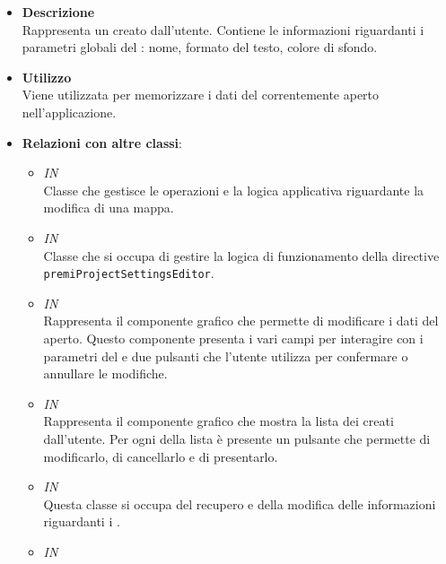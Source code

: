 \FloatBarrier
\begin{itemize}
\item \textbf{Descrizione}\\
Rappresenta un  creato dall’utente. Contiene le informazioni riguardanti i parametri globali del : nome, formato del testo, colore di sfondo.
\item \textbf{Utilizzo}\\
Viene utilizzata per memorizzare i dati del  correntemente aperto nell’applicazione.
\item \textbf{Relazioni con altre classi}:
\begin{itemize}
\item \textit{IN} \hyperref[\nogloxy{Premi::Front-End::Controllers::MindmapEditorController}]{}\\
Classe che gestisce le operazioni e la logica applicativa riguardante la modifica di una mappa.
\item \textit{IN} \hyperref[\nogloxy{Premi::Front-End::Controllers::ProjectSettingsEditorController}]{}\\
Classe che si occupa di gestire la logica di funzionamento della directive \texttt{premiProjectSettingsEditor}.
\item \textit{IN} \hyperref[\nogloxy{Premi::Front-End::Directives::premiProjectSettingsEditor}]{}\\
Rappresenta il componente grafico che permette di modificare i dati del  aperto.
Questo componente presenta i vari campi per interagire con i parametri del  e due pulsanti che l'utente utilizza per confermare o annullare le modifiche.
\item \textit{IN} \hyperref[\nogloxy{Premi::Front-End::Directives::premiProjectsList}]{}\\
Rappresenta il componente grafico che mostra la lista dei  creati dall’utente. Per ogni  della lista è presente un pulsante che permette di modificarlo, di cancellarlo e di presentarlo.
\item \textit{IN} \hyperref[\nogloxy{Premi::Front-End::Services::ProjectService}]{}\\
Questa classe si occupa del recupero e della modifica delle informazioni riguardanti i .
\item \textit{IN} \hyperref[\nogloxy{Premi::Front-End::Views::DashboardView}]{}\\

\end{itemize}
\end{itemize}
